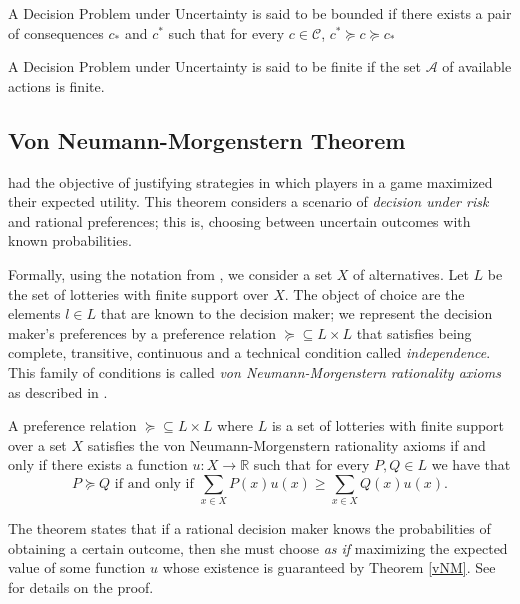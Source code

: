\documentclass{svjour3}                     %
\begin{document}
\begin{definition}
A Decision Problem under Uncertainty is said to be bounded if there exists a pair of consequences $c_\ast$ and $c^\ast$ such that for every $c \in \mathcal{C}$, $c^{\ast} \succeq c \succeq c_\ast$
\end{definition}

\begin{definition}
A Decision Problem under Uncertainty is said to be finite if the set $\mathcal{A}$ of available actions is finite.
\end{definition}

\subsection{Von Neumann-Morgenstern Theorem}
\label{vNM-M}
\cite{von1944theory} had the objective of justifying strategies in which players in a game maximized their expected utility. This theorem considers a scenario of \textit{decision under risk} and rational preferences; this is, choosing between uncertain outcomes with known probabilities. 

Formally, using the notation from \cite{gilboa2009decision}, we consider a set $X$ of alternatives. Let $L$ be the set of lotteries with finite support over $X$. The object of choice are the elements $l \in L$ that are known to the decision maker; we represent the decision maker's preferences by a preference relation $\succeq \subseteq L \times L$ that  satisfies being complete, transitive, continuous and a technical condition called \textit{independence}. This family of conditions is called \textit{von Neumann-Morgenstern rationality axioms} as described in \cite{gilboa2009decision}.

\begin{theorem}{\label{vNM}}
A preference relation $\succeq \subseteq L \times L$ where $L$ is a set of lotteries with finite support over a set $X$ satisfies the von Neumann-Morgenstern rationality axioms if and only if there exists a function $u: X \to \mathbb{R}$ such that for every $P, Q \in L$ we have that
\begin{equation}
P \succeq Q \textrm{ if and only if } \sum_{x \in X} P(x) u(x) \geq \sum_{x \in X} Q(x) u(x). 
\end{equation}
\end{theorem}
The theorem states that if a rational decision maker knows the probabilities of obtaining a certain outcome, then she must choose \textit{as if} maximizing the expected value of some function $u$ whose existence is guaranteed by Theorem \ref{vNM}. See \cite{gilboa2009decision} for details on the proof.
\end{document}
